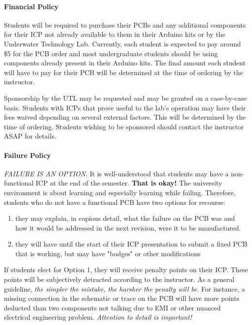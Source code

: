     \paragraph*{Financial Policy} Students will be required to purchase their PCBs and any additional components for their ICP not already available to them in their Arduino kits or by the Underwater Technology Lab. 
    Currently, each student is expected to pay around \$5 for the PCB order and most undergraduate students should be using components already present in their Arduino kits. 
    The final amount each student will have to pay for their PCB will be determined at the time of ordering by the instructor.
    
    Sponsorship by the UTL may be requested and may be granted on a case-by-case basis. Students with ICPs that prove useful to the lab's operation may have their fees waived depending on several external factors.
    This will be determined by the time of ordering.
    Students wishing to be sponsored should contact the instructor ASAP for details.

    \paragraph*{Failure Policy} \emph{FAILURE IS AN OPTION.} It is well-understood that students may have a non-functional ICP at the end of the semester. \textbf{That is okay!}
    The university environment is about learning and especially learning while failing.
    Therefore, students who do not have a functional PCB have two options for recourse:
    \begin{enumerate}
        \item they may explain, in copious detail, what the failure on the PCB was and how it would be addressed in the next revision, were it to be manufactured. 
        \item they will have until the start of their ICP presentation to submit a fixed PCB that is working, but may have "bodges" or other modifications
    \end{enumerate}
    If students elect for Option 1, they will receive penalty points on their ICP. These points will be subjectively detracted according to the instructor. As a general guideline, \emph{the simpler the mistake, the harsher the penalty will be}. 
    For instance, a missing connection in the schematic or trace on the PCB will have more points deducted than two components not talking due to EMI or other nuanced electrical engineering problem.
    \emph{Attention to detail is important!}

